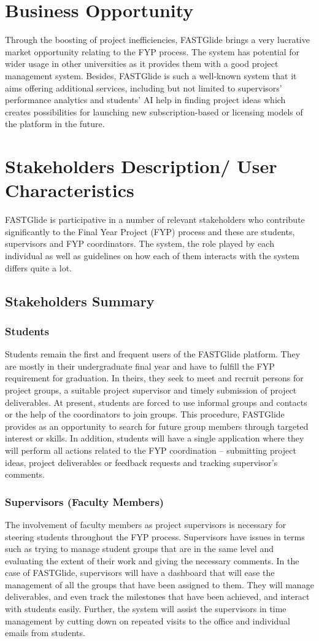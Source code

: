 \documentclass{FastFyp}
\begin{document}
\section{Business Opportunity}
Through the boosting of project inefficiencies, FASTGlide brings a very lucrative market opportunity relating to the FYP process. The system has potential for wider usage in other universities as it provides them with a good project management system. Besides, FASTGlide is such a well-known system that it aims offering additional services, including but not limited to supervisors’ performance analytics and students’ AI help in finding project ideas which creates possibilities for launching new subscription-based or licensing models of the platform in the future.
\section{Stakeholders Description/ User Characteristics}
FASTGlide is participative in a number of relevant stakeholders who contribute significantly to the Final Year Project (FYP) process and these are students, supervisors and FYP coordinators. The system, the role played by each individual as well as guidelines on how each of them interacts with the system differs quite a lot.
\subsection{Stakeholders Summary}
\subsubsection{Students}
Students remain the first and frequent users of the FASTGlide platform. They are mostly in their undergraduate final year and have to fulfill the FYP requirement for graduation. In theirs, they seek to meet and recruit persons for project groups, a suitable project supervisor and timely submission of project deliverables. At present, students are forced to use informal groups and contacts or the help of the coordinators to join groups. This procedure, FASTGlide provides as an opportunity to search for future group members through targeted interest or skills. In addition, students will have a single application where they will perform all actions related to the FYP coordination – submitting project ideas, project deliverables or feedback requests and tracking supervisor’s comments.
\subsubsection{Supervisors (Faculty Members)}
The involvement of faculty members as project supervisors is necessary for steering students throughout the FYP process. Supervisors have issues in terms such as trying to manage student groups that are in the same level and evaluating the extent of their work and giving the necessary comments. In the case of FASTGlide, supervisors will have a dashboard that will ease the management of all the groups that have been assigned to them. They will manage deliverables, and even track the milestones that have been achieved, and interact with students easily. Further, the system will assist the supervisors in time management by cutting down on repeated visits to the office and individual emails from students.
\end{document}
